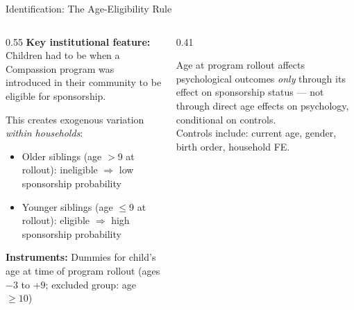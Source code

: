 \documentclass[aspectratio=169, 10pt]{beamer}
\begin{document}
\begin{frame}{Identification: The Age-Eligibility Rule}
  \begin{columns}
    \begin{column}{0.55\textwidth}
      \textbf{Key institutional feature:} Children had to be  when a Compassion program was introduced in their community to be eligible for sponsorship.

      \vspace{0.6em}
      This creates exogenous variation \emph{within households}:
      \begin{itemize}
        \item Older siblings (age $>$9 at rollout): ineligible $\Rightarrow$ low sponsorship probability
        \item Younger siblings (age $\leq$9 at rollout): eligible $\Rightarrow$ high sponsorship probability
      \end{itemize}
      \vspace{0.5em}
      \textbf{Instruments:} Dummies for child's age at time of program rollout (ages $-3$ to $+9$; excluded group: age $\geq 10$)
    \end{column}
    \begin{column}{0.41\textwidth}
      \begin{assumptionbox}
        Age at program rollout affects psychological outcomes \emph{only} through its effect on sponsorship status --- not through direct age effects on psychology, conditional on controls.\\[0.4em]
        Controls include: current age, gender, birth order, household FE.
      \end{assumptionbox}
    \end{column}
  \end{columns}
\end{frame}
\end{document}
